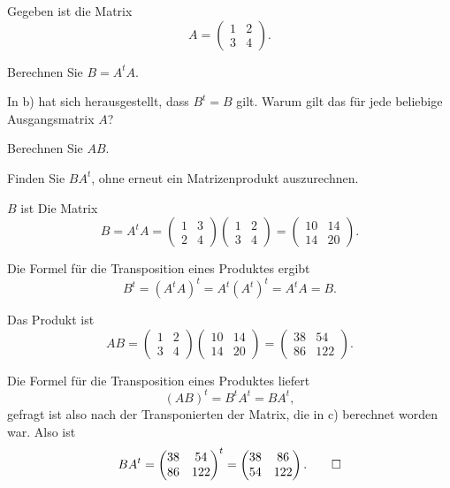 Gegeben ist die Matrix
\[
A
=
\begin{pmatrix}1&2\\3&4\end{pmatrix}.
\]
\begin{teilaufgaben}
\item Berechnen Sie $B=A^tA$.
\item In b) hat sich herausgestellt, dass $B^t=B$ gilt.
Warum gilt das für jede beliebige Ausgangsmatrix $A$?
\item
Berechnen Sie $AB$.
\item
Finden Sie $BA^t$, ohne erneut ein Matrizenprodukt auszurechnen.
\end{teilaufgaben}

\begin{loesung}
\begin{teilaufgaben}
\item $B$ ist Die Matrix
\[
B=A^tA=
\begin{pmatrix}1&3\\2&4\end{pmatrix}
\begin{pmatrix}1&2\\3&4\end{pmatrix}
=
\begin{pmatrix}
10&14\\
14&20
\end{pmatrix}.
\]
\item Die Formel für die Transposition eines Produktes ergibt
\[
B^t
=
(A^tA)^t
=
A^t(A^t)^t
=
A^tA
=
B.
\]
\item
Das Produkt ist
\[
AB
=
\begin{pmatrix}1&2\\3&4\end{pmatrix}
\begin{pmatrix}
10&14\\
14&20
\end{pmatrix}
=
\begin{pmatrix}
38& 54\\
86&122
\end{pmatrix}.
\]
\item
Die Formel für die Transposition eines Produktes liefert
\[
(AB)^t = B^tA^t=BA^t,
\]
gefragt ist also nach der Transponierten der Matrix, die in c) berechnet
worden war.
Also ist
\[
BA^t
= 
\begin{pmatrix}
38& 54\\
86&122
\end{pmatrix}^t
=
\begin{pmatrix}
38& 86\\
54&122
\end{pmatrix}.
\qedhere
\]
\end{teilaufgaben}
\end{loesung}


